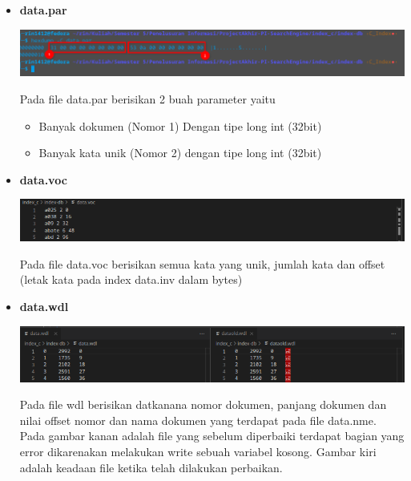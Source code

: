 \documentclass[12pt]{article}
\begin{document}
\begin{itemize}
        \item \textbf{data.par}
        \begin{flushleft}
            \includegraphics[scale=0.58]{images/param.png}

            \justifying
            Pada file data.par berisikan 2 buah parameter yaitu
            \begin{itemize}
                \item Banyak dokumen (Nomor 1) Dengan tipe long int (32bit)
                \item Banyak kata unik (Nomor 2) dengan tipe long int (32bit)
            \end{itemize}
        \end{flushleft}

        \item \textbf{data.voc}
        \begin{flushleft}
            \includegraphics[scale=0.74]{images/voc.png}

            \justifying
            Pada file data.voc berisikan semua kata yang unik, jumlah kata dan offset (letak kata pada index data.inv dalam bytes)
        \end{flushleft}

        \item \textbf{data.wdl}
        \begin{flushleft}
            \includegraphics[scale=0.74]{images/wdl.png}

            \justifying
            Pada file wdl berisikan datkanana nomor dokumen, panjang dokumen dan nilai offset nomor dan nama dokumen yang terdapat pada file data.nme. Pada gambar kanan adalah file yang sebelum diperbaiki terdapat bagian yang error dikarenakan melakukan write sebuah variabel kosong. Gambar kiri adalah keadaan file ketika telah dilakukan perbaikan.
        \end{flushleft}
    \end{itemize}
\end{document}

